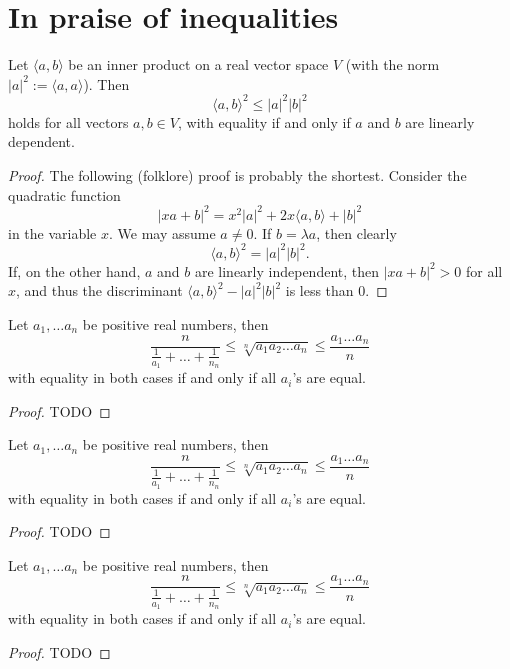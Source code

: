 \chapter{In praise of inequalities}
\label{chapter20}
\begin{theorem}
  \label{ch20theoremI}
  \leanok
Let $\langle a, b \rangle$ be an inner product on a real vector space $V$ (with the norm $|a|^2 := \langle a, a \rangle$). Then
\[
\langle a, b \rangle^2 \leq |a|^2 |b|^2
\]
holds for all vectors $a, b \in V$, with equality if and only if $a$ and $b$ are linearly dependent.
\end{theorem}
\begin{proof}
  \leanok
The following (folklore) proof is probably the shortest. Consider the quadratic function
\[
|x a + b|^2 = x^2 |a|^2 + 2x \langle a, b \rangle + |b|^2
\]
in the variable $x$. We may assume $a \neq 0$. If $b = \lambda a$, then clearly
\[
\langle a, b \rangle^2 = |a|^2 |b|^2.
\]
If, on the other hand, $a$ and $b$ are linearly independent, then $|x a + b|^2 > 0$ for all $x$,
and thus the discriminant $\langle a, b \rangle^2 - |a|^2 |b|^2$ is less than 0.
\end{proof}

\begin{theorem}
  \label{ch20theoremIIproof1}
  Let $a_1, \dots a_n$ be positive real numbers, then
  \[
  \frac{n}{\frac{1}{a_1}+\dots+\frac{1}{n_n}} \le
    \sqrt[n]{a_1a_2\dots a_n} \le
    \frac{a_1\dots a_n}{n}
  \]
 with equality in both cases if and only if all $a_i$'s are equal.
\end{theorem}
 \begin{proof}
  TODO
\end{proof}

\begin{theorem}
  \label{ch20theoremIIproof2}
  Let $a_1, \dots a_n$ be positive real numbers, then
  \[
  \frac{n}{\frac{1}{a_1}+\dots+\frac{1}{n_n}} \le
    \sqrt[n]{a_1a_2\dots a_n} \le
    \frac{a_1\dots a_n}{n}
  \]
 with equality in both cases if and only if all $a_i$'s are equal.
\end{theorem}
 \begin{proof}
  TODO
\end{proof}

\begin{theorem}
  \label{ch20theoremIIproof3}
  Let $a_1, \dots a_n$ be positive real numbers, then
  \[
  \frac{n}{\frac{1}{a_1}+\dots+\frac{1}{n_n}} \le
    \sqrt[n]{a_1a_2\dots a_n} \le
    \frac{a_1\dots a_n}{n}
  \]
 with equality in both cases if and only if all $a_i$'s are equal.
\end{theorem}
 \begin{proof}
  TODO
\end{proof}

